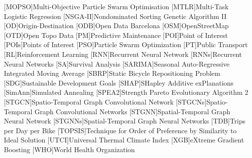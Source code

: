 \begin{acronym}
        [MOPSO]{Multi-Objective Particle Swarm Optimisation}
        [MTLR]{Multi-Task Logistic Regression}
        [NSGA-II]{Nondominated Sorting Genetic Algorithm II}
        [OD]{Origin-Destination}
        [ODB]{Open Data Barcelona}
        [OSM]{OpenStreetMap}
        [OTD]{Open Topo Data}
        [PM]{Predictive Maintenance}
        [POI]{Point of Interest}
        [POIs]{Points of Interest}
        [PSO]{Particle Swarm Optimization}
        [PT]{Public Transport}
        [RL]{Reinforcement Learning}
        [RNN]{Recurrent Neural Network}
        [RNNs]{Recurrent Neural Networks}
        [SA]{Survival Analysis}
        [SARIMA]{Seasonal Auto-Regressive Integrated Moving Average}
        [SBRP]{Static Bicycle Repositioning Problem}
        [SDG]{Sustainable Development Goals}
        [SHAP]{SHapley Additive exPlanations}
        [SimAnn]{Simulated Annealing}
        [SPEA2]{Strength Pareto Evolutionary Algorithm 2}
        [STGCN]{Spatio-Temporal Graph Convolutional Network}
        [STGCNs]{Spatio-Temporal Graph Convolutional Networks}
        [STGNN]{Spatial-Temporal Graph Neural Network}
        [STGNNs]{Spatial-Temporal Graph Neural Networks}
        [TDB]{Trips per Day per Bike}
        [TOPSIS]{Technique for Order of Preference by Similarity to Ideal Solution}
        [UTCI]{Universal Thermal Climate Index}
        [XGB]{eXtreme Gradient Boosting}
        [WHO]{World Health Organization}        
        
\end{acronym}

